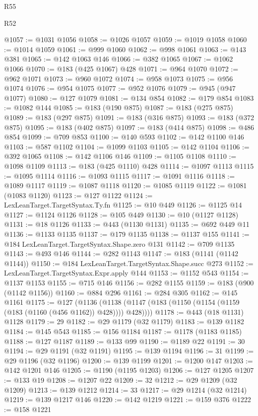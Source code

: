 \begin{lexlean}{R55}
\begin{lexlean}{R52}
\begin{coremodule}
{{{{{{{{{{{{{{{{{{{{{{{{{{{{{{{{{{{{{{{{{{{{{{{{{{{{{{{{{{{{{{{{{{{{{{{{{{{{{{{{{{{{{{{{{{{{{{{{{{{{{{{{{{{{{{{{{{{{{{{{{{{{{{{{{{{{{{{{{{{{{{{{{{{{{{{{{{{{{{{{{{{{{{{{{{{{{{{{{{{{{{{{{{{{{{{{{{{{{{@1057 := @1031 @1056
@1058 := @1026 @1057
@1059 := @1019 @1058
@1060 := @1014 @1059
@1061 := @999 @1060
@1062 := @998 @1061
@1063 := @143 @381
@1065 := @142 @1063 @146
@1066 := @382 @1065
@1067 := @1062 @1066
@1070 := @183 (@425 @1067) @428
@1071 := @964 @1070
@1072 := @962 @1071
@1073 := @960 @1072
@1074 := @958 @1073
@1075 := @956 @1074
@1076 := @954 @1075
@1077 := @952 @1076
@1079 := @945 (@947 @1077)
@1080 := @127 @1079
@1081 := @134 @854
@1082 := @179 @854
@1083 := @1082 @144
@1085 := @183 (@190 @875)
@1087 := @183 (@275 @875)
@1089 := @183 (@297 @875)
@1091 := @183 (@316 @875)
@1093 := @183 (@372 @875)
@1095 := @183 (@402 @875)
@1097 := @183 (@414 @875)
@1098 := @486 @854
@1099 := @709 @853
@1100 := @140 @593
@1102 := @142 @1100 @146
@1103 := @587 @1102
@1104 := @1099 @1103
@1105 := @142 @1104
@1106 := @392 @1065
@1108 := @142 @1106 @146
@1109 := @1105 @1108
@1110 := @1098 @1109
@1113 := @183 (@425 @1110) @428
@1114 := @1097 @1113
@1115 := @1095 @1114
@1116 := @1093 @1115
@1117 := @1091 @1116
@1118 := @1089 @1117
@1119 := @1087 @1118
@1120 := @1085 @1119
@1122 := @1081 (@1083 @1120)
@1123 := @127 @1122
@1124 := LexLeanTarget.TargetSyntax.Ty.fn
@1125 := @10 @449
@1126 := @1125 @14
@1127 := @1124 @1126
@1128 := @105 @449
@1130 := @10 (@1127 @1128)
@1131 := @18 @1126
@1133 := @443 (@1130 @1131)
@1135 := @692 @449 @11
@1136 := @1133 @1135
@1137 := @179 @1135
@1138 := @1137 @155
@1141 := @184 LexLeanTarget.TargetSyntax.Shape.zero @131
@1142 := @709 @1135
@1143 := @493 @146
@1144 := @282 @1143
@1147 := @183 (@1141 (@1142 @1144))
@1150 := @184 LexLeanTarget.TargetSyntax.Shape.succ @273
@1152 := LexLeanTarget.TargetSyntax.Expr.apply @144
@1153 := @1152 @543
@1154 := @1137 @1153
@1155 := @715 @146
@1156 := @282 @1155
@1159 := @183 (@900 (@1142 @1156))
@1160 := @884 @296
@1161 := @284 @305
@1162 := @145 @1161
@1175 := @127
    (@1136 (@1138 (@1147 (@183 (@1150 (@1154 (@1159 (@183 (@1160 (@456 @1162)) @428)))) @428))))
@1178 := @443 (@18 @1131) @1128
@1179 := 29
@1182 := @29 @1179 (@32 @1179)
@1183 := @139 @1182
@1184 := @145 @543
@1185 := @156 @1184
@1187 := @1178 (@1183 @1185)
@1188 := @127 @1187
@1189 := @133 @99
@1190 := @1189 @22
@1191 := 30
@1194 := @29 @1191 (@32 @1191)
@1195 := @139 @1194
@1196 := 31
@1199 := @29 @1196 (@32 @1196)
@1200 := @139 @1199
@1201 := @1200 @147
@1203 := @142 @1201 @146
@1205 := @1190 (@1195 @1203)
@1206 := @127 @1205
@1207 := @133 @19
@1208 := @1207 @22
@1209 := 32
@1212 := @29 @1209 (@32 @1209)
@1213 := @139 @1212
@1214 := 33
@1217 := @29 @1214 (@32 @1214)
@1219 := @139 @1217 @146
@1220 := @142 @1219
@1221 := @159 @376
@1222 := @158 @1221
}}}}}}}}}}}}}}}}}}}}}}}}}}}}}}}}}}}}}}}}}}}}}}}}}}}}}}}}}}}}}}}}}}}}}}}}}}}}}}}}}}}}}}}}}}}}}}}}}}}}}}}}}}}}}}}}}}}}}}}}}}}}}}}}}}}}}}}}}}}}}}}}}}}}}}}}}}}}}}}}}}}}}}}}}}}}}}}}}}}}}}}}}}}}}}}}}}}}}}
\end{coremodule}
\end{lexlean}
\end{lexlean}
